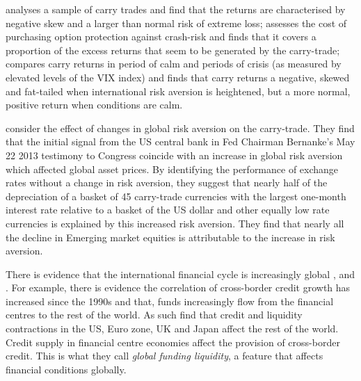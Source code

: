 \documentclass[12pt, a4paper, oneside]{article} %
\begin{document}
\citet{BrunnermeierCarry} analyses a sample of carry trades and find that the returns are characterised by negative skew and a larger than normal risk of extreme loss; \citet{JurekCrash} assesses the cost of purchasing option protection against crash-risk and finds that it covers a proportion of the excess returns that seem to be generated by the carry-trade; \citet{Hayward2013} compares carry returns in period of calm and periods of crisis (as measured by elevated levels of the VIX index) and finds that carry returns a negative, skewed and fat-tailed when international risk aversion is heightened, but a more normal, positive return when conditions are calm. 

 
\citet{NYFedtaper} consider the effect of changes in global risk aversion on the carry-trade.  They find that the initial signal from the US central bank in Fed Chairman Bernanke's May 22 2013 testimony to Congress coincide with an increase in global risk aversion which affected global asset prices. %
By identifying the performance of exchange rates without a change in risk aversion, they suggest that nearly half of the depreciation of a basket of 45 carry-trade currencies with the largest one-month interest rate relative to a basket of the US dollar and other equally low rate currencies is explained by this increased risk aversion. They find that nearly all the decline in Emerging market equities is attributable to the increase in risk aversion.

There is evidence that the international financial cycle is increasingly global \citet{Rey2013}, \citet{Obstfeld2014} and \citet{Bruno2014}.  %
For example, there is evidence the correlation of cross-border credit growth has increased since the 1990s and that, funds increasingly flow from the financial centres to the rest of the world. As such \citet{Cerutti2014} find that credit and liquidity contractions in  the US, Euro zone, UK and Japan affect the rest of the world. Credit supply in financial centre economies affect the provision of cross-border credit.  This is what they call \emph{global funding liquidity}, a feature that affects financial conditions globally. 

\end{document}
